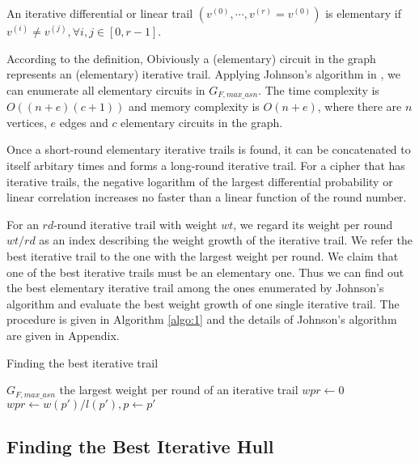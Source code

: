 \begin{definition}
    An iterative differential or linear trail $(v^{(0)},\cdots,v^{(r)}=v^{(0)})$ is elementary if $v^{(i)}\neq v^{(j)},\forall i,j\in [0,r-1]$.
\end{definition}

According to the definition, Obiviously a (elementary) circuit in the graph represents an (elementary) iterative trail. Applying Johnson's algorithm in \cite{J75}, we can enumerate all elementary circuits in $G_{F,max\_asn}$. The time complexity is $O((n + e)(c + 1))$ and memory complexity is $O(n + e)$, where there are $n$ vertices, $e$ edges and $c$ elementary circuits in the graph.

Once a short-round elementary iterative trails is found, it can be concatenated to itself arbitary times and forms a long-round iterative trail. For a cipher that has iterative trails, the negative logarithm of the largest differential probability or linear correlation increases no faster than a linear function of the round number. 

For an $rd$-round iterative trail with weight $wt$, we regard its weight per round $wt/rd$ as an index describing the weight growth of the iterative trail. We refer the best iterative trail to the one with the largest weight per round. We claim that one of the best iterative trails must be an elementary one. Thus we can find out the best elementary iterative trail
among the ones enumerated by Johnson's algorithm \cite{J75} and evaluate the best weight growth of one single iterative trail. The procedure is given in Algorithm \ref{algo:1} and the details of Johnson's algorithm are given in Appendix. 

\begin{algorithm}
	\caption{Finding the best iterative trail}
	\label{algo:1}
	\begin{algorithmic}[1]
		\Require $G_{F,max\_asn}$
		\Ensure the largest weight per round of an iterative trail
		\Procedure {}{}
		\State $wpr\leftarrow 0$
		\State $wpr\leftarrow w(p')/l(p'),p\leftarrow p'$
		\EndIf
		\EndFor
		\State {}
		\EndProcedure
	\end{algorithmic}
\end{algorithm}

\subsection{Finding the Best Iterative Hull}\label{sec:fbih}

